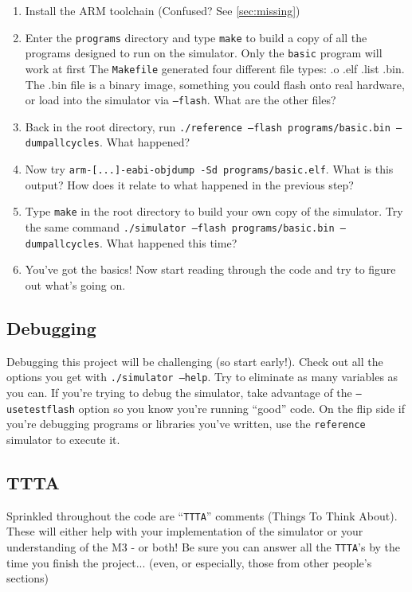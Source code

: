\documentclass{article}
\begin{document}
\begin{enumerate}
\item Install the ARM toolchain (Confused? See \ref{sec:missing})
\item Enter the {\tt programs} directory and type {\tt make} to build a copy
of all the programs designed to run on the simulator. Only the {\tt basic}
program will work at first
\subitem The {\tt Makefile} generated four different file types: .o .elf .list
.bin.  The .bin file is a binary image, something you could flash onto real
hardware, or load into the simulator via {\tt --flash}. What are the other
files?
\item Back in the root directory, run {\tt ./reference --flash
programs/basic.bin --dumpallcycles}. What happened?
\item Now try {\tt arm-[...]-eabi-objdump -Sd programs/basic.elf}. What is
this output? How does it relate to what happened in the previous step?
\item Type {\tt make} in the root directory to build your own copy of the
simulator. Try the same command {\tt ./simulator --flash programs/basic.bin
--dumpallcycles}. What happened this time?
\item You've got the basics! Now start reading through the code and try to
figure out what's going on.
\end{enumerate}

\subsection{Debugging}
\label{sec:debugging}

Debugging this project will be challenging (so start early!). Check out all
the options you get with {\tt ./simulator --help}. Try to eliminate as many
variables as you can. If you're trying to debug the simulator, take advantage
of the {\tt --usetestflash} option so you know you're running ``good'' code.
On the flip side if you're debugging programs or libraries you've written, use
the {\tt reference} simulator to execute it.

\subsection{TTTA}
\label{sec:TTTA}
Sprinkled throughout the code are ``{\tt TTTA}'' comments (Things To Think
About).  These will either help with your implementation of the simulator or
your understanding of the M3 - or both! Be sure you can answer all the
{\tt TTTA}'s by the time you finish the project... (even, or especially, those
from other people's sections)
\end{document}
